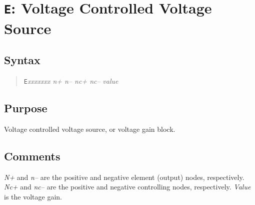 \section{{\tt E}: Voltage Controlled Voltage Source}
\subsection{Syntax}
\begin{verse}
{\tt E}{\it xxxxxxx n+ n-- nc+ nc--} {\it value}
\end{verse}
\subsection{Purpose}

Voltage controlled voltage source, or voltage gain block.
\subsection{Comments}

{\it N+} and {\it n--} are the positive and negative element (output) nodes,
respectively.  {\it Nc+} and {\it nc--} are the positive and negative
controlling nodes, respectively.  {\it Value} is the voltage gain.
